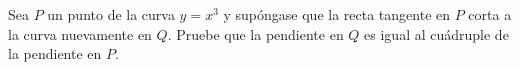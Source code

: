 \item Sea $P$ un punto de la curva $y = x^3$ y supóngase que la recta tangente en $P$ corta a la curva nuevamente en $Q$. Pruebe que la pendiente en $Q$ es igual al cuádruple de la pendiente en $P$.
